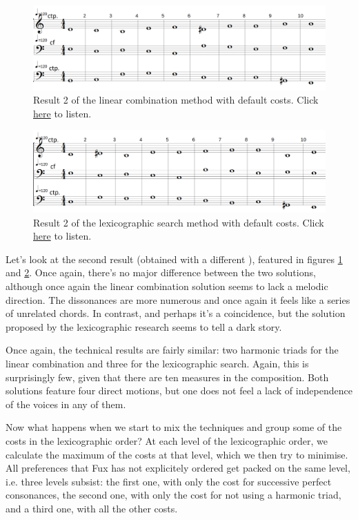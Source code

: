 \begin{figure}[h]
    \centering
    \includegraphics[width=1\textwidth]{Images/Experiments/linear-combination-1sp0.png}
    \caption{Result 2 of the linear combination method with default costs. Click \href{https://example.com/}{here} to listen.}
    \label{fig:combili-1sp0}
\end{figure}

\begin{figure}[h]
    \centering
    \includegraphics[width=1\textwidth]{Images/Experiments/basic-lexico-1sp0.png}
    \caption{Result 2 of the lexicographic search method with default costs. Click \href{https://youtu.be/FdsxyXVvBTE}{here} to listen.}
    \label{fig:lexico-1sp0}
\end{figure}

Let's look at the second result (obtained with a different \cf), featured in figures \ref{fig:combili-1sp0} and \ref{fig:lexico-1sp0}. Once again, there's no major difference between the two solutions, although once again the linear combination solution seems to lack a melodic direction. The dissonances are more numerous and once again it feels like a series of unrelated chords. In contrast, and perhaps it's a coincidence, but the solution proposed by the lexicographic research seems to tell a dark story.

Once again, the technical results are fairly similar: two harmonic triads for the linear combination and three for the lexicographic search. Again, this is surprisingly few, given that there are ten measures in the composition. Both solutions feature four direct motions, but one does not feel a lack of independence of the voices in any of them.

Now what happens when we start to mix the techniques and group some of the costs in the lexicographic order? At each level of the lexicographic order, we calculate the maximum of the costs at that level, which we then try to minimise. All preferences that Fux has not explicitely ordered get packed on the same level, i.e. three levels subsist: the first one, with only the cost for successive perfect consonances, the second one, with only the cost for not using a harmonic triad, and a third one, with all the other costs.

